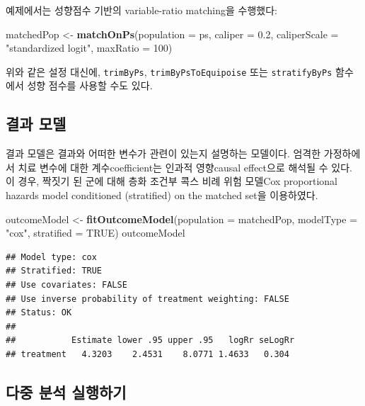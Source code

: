 \documentclass[10.5pt]{book}
\newenvironment{Shaded}{\begin{snugshade}}{\end{snugshade}}
\newcommand{\KeywordTok}[1]{\textcolor[rgb]{0.13,0.29,0.53}{\textbf{#1}}}
\newcommand{\DataTypeTok}[1]{\textcolor[rgb]{0.13,0.29,0.53}{#1}}
\newcommand{\DecValTok}[1]{\textcolor[rgb]{0.00,0.00,0.81}{#1}}
\newcommand{\FloatTok}[1]{\textcolor[rgb]{0.00,0.00,0.81}{#1}}
\newcommand{\StringTok}[1]{\textcolor[rgb]{0.31,0.60,0.02}{#1}}
\newcommand{\OtherTok}[1]{\textcolor[rgb]{0.56,0.35,0.01}{#1}}
\newcommand{\NormalTok}[1]{#1}
\theoremstyle{definition}
\theoremstyle{definition}
\theoremstyle{definition}
\theoremstyle{remark}
\begin{document}
예제에서는 성향점수 기반의 variable-ratio matching을 수행했다:

\begin{Shaded}
\begin{Highlighting}[]
\NormalTok{matchedPop <-}\StringTok{ }\KeywordTok{matchOnPs}\NormalTok{(}\DataTypeTok{population =}\NormalTok{ ps, }\DataTypeTok{caliper =} \FloatTok{0.2}\NormalTok{,}
                        \DataTypeTok{caliperScale =} \StringTok{"standardized logit"}\NormalTok{, }\DataTypeTok{maxRatio =} \DecValTok{100}\NormalTok{)}
\end{Highlighting}
\end{Shaded}

위와 같은 설정 대신에, \texttt{trimByPs}, \texttt{trimByPsToEquipoise}
또는 \texttt{stratifyByPs} 함수에서 성향 점수를 사용할 수도 있다.

\subsection{결과 모델}\label{-}

결과 모델은 결과와 어떠한 변수가 관련이 있는지 설명하는 모델이다. 엄격한
가정하에서 치료 변수에 대한 계수coefficient는 인과적 영향causal
effect으로 해석될 수 있다. 이 경우, 짝짓기 된 군에 대해 층화 조건부 콕스
비례 위험 모델Cox proportional hazards model conditioned (stratified) on
the matched set을 이용하였다.

\begin{Shaded}
\begin{Highlighting}[]
\NormalTok{outcomeModel <-}\StringTok{ }\KeywordTok{fitOutcomeModel}\NormalTok{(}\DataTypeTok{population =}\NormalTok{ matchedPop,}
                                \DataTypeTok{modelType =} \StringTok{"cox"}\NormalTok{,}
                                \DataTypeTok{stratified =} \OtherTok{TRUE}\NormalTok{)}
\NormalTok{outcomeModel}
\end{Highlighting}
\end{Shaded}

\begin{verbatim}
## Model type: cox
## Stratified: TRUE
## Use covariates: FALSE
## Use inverse probability of treatment weighting: FALSE
## Status: OK
## 
##           Estimate lower .95 upper .95   logRr seLogRr
## treatment   4.3203    2.4531    8.0771 1.4633   0.304
\end{verbatim}

\subsection{다중 분석 실행하기}\label{MultipleAnalyses}
\end{document}
